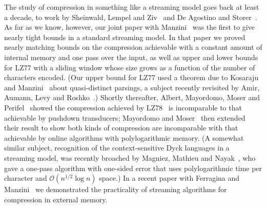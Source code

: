 \documentclass[runningheads]{llncs}
\newcommand{\Oh}[1]
    {\ensuremath{\mathcal{O}\!\left( {#1} \right)}}
\begin{document}
The study of compression in something like a streaming model goes back at least a decade, to work by Sheinwald, Lempel and Ziv~\cite{SLZ95} and De Agostino and Storer~\cite{DS96}.  As far as we know, however, our joint paper with Manzini~\cite{GM07} was the first to give nearly tight bounds in a standard streaming model.  In that paper we proved nearly matching bounds on the compression achievable with a constant amount of internal memory and one pass over the input, as well as upper and lower bounds for LZ77 with a sliding window whose size grows as a function of the number of characters encoded.  (Our upper bound for LZ77 used a theorem due to Kosaraju and Manzini~\cite{KM99} about quasi-distinct parsings, a subject recently revisited by Amir, Aumann, Levy and Roshko~\cite{AALR09}.)  Shortly thereafter, Albert, Mayordomo, Moser and Perifel~\cite{AMMP08} showed the compression achieved by LZ78~\cite{ZL78} is incomparable to that achievable by pushdown transducers; Mayordomo and Moser~\cite{MM09} then extended their result to show both kinds of compression are incomparable with that achievable by online algorithms with polylogarithmic memory.  (A somewhat similar subject, recognition of the context-sensitive Dyck languages in a streaming model, was recently broached by Magniez, Mathieu and Nayak~\cite{MMN09}, who gave a one-pass algorithm with one-sided error that uses polylogarithmic time per character and $\Oh{n^{1 / 2} \log n}$ space.)  In a recent paper with Ferragina and Manzini~\cite{FGM10} we demonstrated the practicality of streaming algorithms for compression in external memory.
\end{document}
